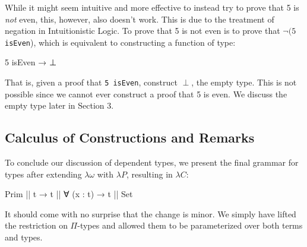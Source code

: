 \documentclass[12pt]{article}
\begin{document}
While it might seem intuitive and more effective to instead try to prove that 5
is {\em not} even, this, however, also doesn't work. This is due to the
treatment of negation in Intuitionistic Logic. To prove that 5 is not even is
to prove that \(\neg (5\) {\tt isEven}), which is equivalent to constructing a
function of type:
\begin{center}
\begin{minipage}{0.2\textwidth}
\begin{code}
5 isEven → ⊥
\end{code}
\end{minipage}
\end{center}
That is, given a proof that {\tt 5 isEven}, construct \(\perp\), the empty type.
This is not possible since we cannot ever construct a proof that 5 is even. We
discuss the empty type later in Section 3.

\subsection*{Calculus of Constructions and Remarks}
To conclude our discussion of dependent types, we present the final grammar for
types after extending \(\lambda\omega\) with \(\lambda P\), resulting in
\(\lambda C\):
\begin{center}
\begin{minipage}{0.5\textwidth}
\begin{code}
Prim || t → t || ∀ (x : t) → t || Set
\end{code}
\end{minipage}
\end{center}
It should come with no surprise that the change is minor. We simply have lifted
the restriction on \(\Pi\)-types and allowed them to be parameterized over both
terms and types.
\end{document}
